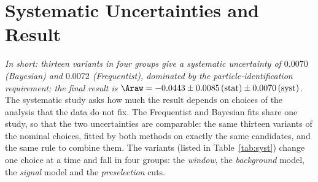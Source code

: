 \section{Systematic Uncertainties and Result}
\label{sec:syst}
\label{app:syst}
\emph{In short: thirteen variants in four groups give a systematic uncertainty of $0.0070$ (Bayesian) and $0.0072$ (Frequentist), dominated by the particle-identification requirement; the final result is $\Araw=-0.0443\pm0.0085\,(\text{stat})\pm0.0070\,(\text{syst})$.}
The systematic study asks how much the result depends on choices of the analysis that the data do not fix. The Frequentist and Bayesian fits share one study, so that the two uncertainties are comparable: the same thirteen variants of the nominal choices, fitted by both methods on exactly the same candidates, and the same rule to combine them. The variants (listed in Table~\ref{tab:syst}) change one choice at a time and fall in four groups: the \emph{window}, the \emph{background} model, the \emph{signal} model and the \emph{preselection} cuts.

